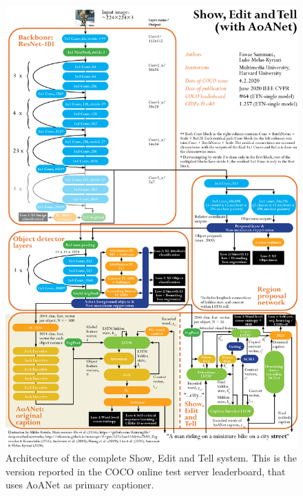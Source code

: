 \documentclass[english,twoside,openright]{HYgraduMLDS}
\begin{document}
\pagebreak
\begin{figure}[H] 
\centering
\includegraphics[width=1.0\textwidth]{./images-indesign/Architecture_ShowEdit.png}
\caption{Architecture of the complete Show, Edit and Tell system. This is the version reported in the COCO online test server leaderboard, that uses AoANet as primary captioner.}
\label{fig:architecture_ShowEdit} 
\end{figure}
\end{document}
